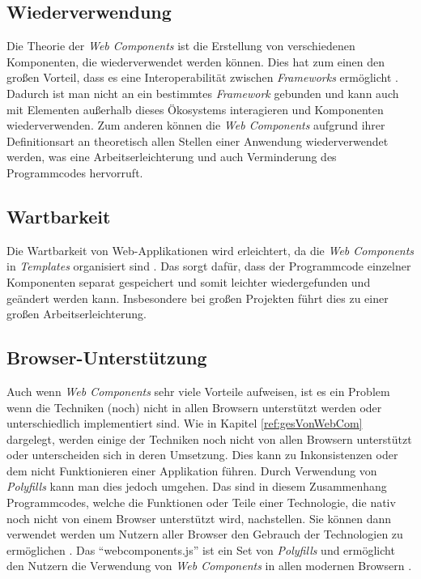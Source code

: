 \documentclass[12pt, paper=a4, bibtotoc, toc=listof, headsepline=true, numbers=endperiod]{scrreprt}
\begin{document}
			\subsection{Wiederverwendung}
			Die Theorie der \emph{Web Components} ist die Erstellung von verschiedenen Komponenten, die wiederverwendet werden können. Dies hat zum einen den großen Vorteil, dass es eine Interoperabilität zwischen \emph{Frameworks} ermöglicht \cite[S.2]{patel2015learning}. Dadurch ist man nicht an ein bestimmtes \emph{Framework} gebunden und kann auch mit Elementen außerhalb dieses Ökosystems interagieren und Komponenten wiederverwenden. Zum anderen können die \emph{Web Components} aufgrund ihrer Definitionsart an theoretisch allen Stellen einer Anwendung wiederverwendet werden, was eine Arbeitserleichterung und auch Verminderung des Programmcodes hervorruft. 
			\subsection{Wartbarkeit}
			Die Wartbarkeit von Web-Applikationen wird erleichtert, da die \emph{Web Components} in \emph{Templates} organisiert sind \cite[S.2]{patel2015learning}. Das sorgt dafür, dass der Programmcode einzelner Komponenten separat gespeichert und somit leichter wiedergefunden und geändert werden kann. Insbesondere bei großen Projekten führt dies zu einer großen Arbeitserleichterung.
			\subsection{Browser-Unterstützung}
			\label{sec:broUnt}
			Auch wenn \emph{Web Components} sehr viele Vorteile aufweisen, ist es ein Problem wenn die Techniken (noch) nicht in allen Browsern unterstützt werden oder unterschiedlich implementiert sind. Wie in Kapitel \ref{ref:gesVonWebCom} dargelegt, werden einige der Techniken noch nicht von allen Browsern unterstützt oder unterscheiden sich in deren Umsetzung. Dies kann zu Inkonsistenzen oder dem nicht Funktionieren einer Applikation führen. Durch Verwendung von  \emph{Polyfills} kann man dies jedoch umgehen. Das sind in diesem Zusammenhang Programmcodes, welche die Funktionen oder Teile einer Technologie, die nativ noch nicht von einem Browser unterstützt wird, nachstellen. Sie können dann verwendet werden um Nutzern aller Browser den Gebrauch der Technologien zu ermöglichen \cite[S.4]{satrom2014building}. Das \enquote{webcomponents.js} ist ein Set von \emph{Polyfills} und ermöglicht den Nutzern die Verwendung von \emph{Web Components} in allen modernen Browsern \cite{webComJs}.
\end{document}
